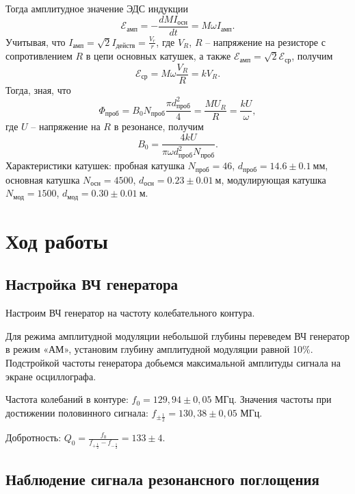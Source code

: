\documentclass[a4paper,12pt]{article} %
\begin{document}
Тогда амплитудное значение ЭДС индукции
\[\mathcal{E}_{\text{амп}} = - \dfrac{dM I_{\text{осн}}}{dt} = M \omega I_{\text{амп}}.\]
Учитывая, что $I_{\text{амп}} = \sqrt{2} I_{\text{действ}}=\frac{V_r}{r}$, где $V_R$, $R$ -- напряжение на резисторе с сопротивлением $R$ в цепи основных катушек, а также $\mathcal{E}_{\text{амп}} = \sqrt{2}\mathcal{E}_{\text{ср}}$, получим
\[\mathcal{E}_{\text{ср}} = M \omega \dfrac{V_R}{R} = k V_R.\]
Тогда, зная, что
\[\Phi_{\text{проб}} = B_0 N_{\text{проб}} \dfrac{\pi d_{\text{проб}}^2}{4} =  \dfrac{MU_R}{R} = \dfrac{k U}{\omega},\]
где $U$ -- напряжение на $R$ в резонансе, получим
\begin{equation}\label{1}
B_0 = \dfrac{4k U}{\pi \omega d^2_{\text{проб}} N_{\text{проб}}}.
\end{equation}
Характеристики катушек: пробная катушка $N_{\text{проб}} = 46$, $d_{\text{проб}} = 14.6\pm 0.1~\text{мм}$, основная катушка $N_{\text{осн}} = 4500$, $d_{\text{осн}} = 0.23\pm 0.01~\text{м}$,  модулирующая катушка $N_{\text{мод}} = 1500$, $d_{\text{мод}} = 0.30\pm 0.01~\text{м}$.

\newpage

\section{Ход работы}
\subsection{Настройка ВЧ генератора}

\noindent Настроим ВЧ генератор на частоту колебательного контура.

\medskip

\noindent Для режима амплитудной модуляции небольшой глубины переведем ВЧ генератор в
режим «АМ», установим глубину амплитудной модуляции равной 10$\%$. Подстройкой
частоты генератора добьемся максимальной амплитуды сигнала на экране
осциллографа. 

\medskip

\noindent Частота колебаний в контуре: $f_0 = 129,94 \pm 0,05 \text{ МГц}$.
Значения частоты при достижении половинного сигнала: $f_{\pm \frac{1}{2}} = 130,38 \pm 0,05 \text{ МГц}.$

\medskip

\noindent Добротность: $Q_0 = \frac{f_0}{f_{+ \frac{1}{2}} - f_{- \frac{1}{2}}} = 133 \pm 4.$

\subsection{Наблюдение сигнала резонансного поглощения}
\end{document}
